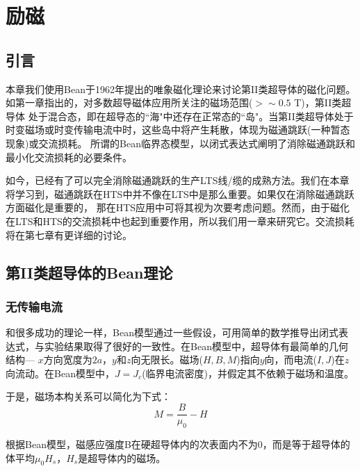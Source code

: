 \chapter{励磁}
\section{引言}
本章我们使用Bean于1962年提出的唯象磁化理论来讨论第II类超导体的磁化问题。如第一章指出的，对多数超导磁体应用所关注的磁场范围($>\sim 0.5$ T)，第II类超导体
处于混合态，即在超导态的``海"中还存在正常态的``岛"。当第II类超导体处于时变磁场或时变传输电流中时，这些岛中将产生耗散，体现为磁通跳跃(一种暂态现象)或交流损耗。
所谓的Bean临界态模型，以闭式表达式阐明了消除磁通跳跃和最小化交流损耗的必要条件。

如今，已经有了可以完全消除磁通跳跃的生产LTS线/缆的成熟方法。我们在本章将学习到，磁通跳跃在HTS中并不像在LTS中是那么重要。如果仅在消除磁通跳跃方面磁化是重要的，
那在HTS应用中可将其视为次要考虑问题。然而，由于磁化在LTS和HTS的交流损耗中也起到重要作用，所以我们用一章来研究它。交流损耗将在第七章有更详细的讨论。

\section{第II类超导体的Bean理论}
\subsection{无传输电流}
和很多成功的理论一样，Bean模型通过一些假设，可用简单的数学推导出闭式表达式，与实验结果取得了很好的一致性。在Bean模型中，超导体有最简单的几何结构---
$x$方向宽度为$2a$，$y$和$z$向无限长。磁场($H, B, M$)指向$y$向，而电流($I, J$)在$z$向流动。在Bean模型中，$J=J_c$(临界电流密度)，并假定其不依赖于磁场和温度。

于是，磁场本构关系可以简化为下式：
\begin{equation}
  M=\frac{B}{\mu_0} -H
\end{equation}

根据Bean模型，磁感应强度B在硬超导体内的次表面内不为0，而是等于超导体的体平均$\mu_0 H_s$，$H_s$是超导体内的磁场。

